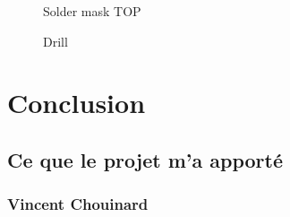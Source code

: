 \documentclass[10pt,a4paper,final]{article}
\begin{document}
\begin{spacing}{1.5}
\begin{figure}[hbtp]
\bigskip
\bigskip
\bigskip
\bigskip
\bigskip

\caption{Solder mask TOP}
\end{figure}

\vfill
\pagebreak



\begin{figure}[hbtp]
\caption{Drill}
\centering
{}
\end{figure}




\pagebreak
\section{Conclusion}

\subsection{Ce que le projet m'a apporté}
\subsubsection{Vincent Chouinard}


\end{spacing}
\end{document}
